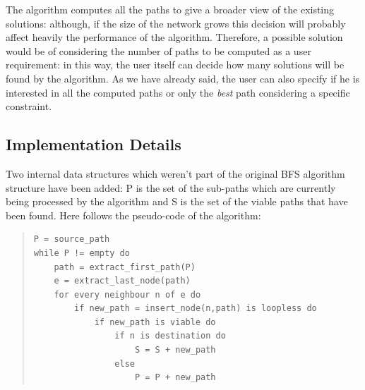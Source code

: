 \documentclass[10pt,a4paper]{report}
\begin{document}
The algorithm computes all the paths to give a broader view of the
existing solutions: although, if the size of the network grows this
decision will probably affect heavily the performance of the
algorithm. Therefore, a possible solution would be of considering the
number of paths to be computed as a user requirement: in this way, the
user itself can decide how many solutions will be found by the
algorithm. As we have already said, the user can also specify if he is
interested in all the computed paths or only the \textit{best} path
considering a specific constraint.

\newpage

\subsection{Implementation Details}

Two internal data structures which weren't part of the original BFS
algorithm structure have been added: P is the set of the sub-paths
which are currently being processed by the algorithm and S is the set
of the viable paths that have been found. Here follows the pseudo-code
of the algorithm:

\begin{quote}
\begin{lstlisting}
P = source_path
while P != empty do
    path = extract_first_path(P)
    e = extract_last_node(path)
    for every neighbour n of e do
        if new_path = insert_node(n,path) is loopless do
            if new_path is viable do
                if n is destination do
                    S = S + new_path
                else
                    P = P + new_path
\end{lstlisting}
\end{quote}
\end{document}
